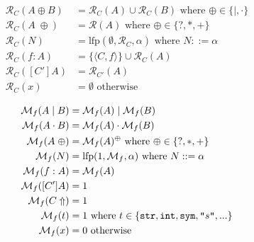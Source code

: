 \documentclass[a4paper]{article}
\begin{document}
\def\fixpoint{\ensuremath{\text{lfp}}}
\def\reachability{\ensuremath{\mathcal{R}}}
\begin{align}
\reachability_C(A \oplus B) &= \reachability_C(A) \cup \reachability_C(B)
 \text{ where } \oplus \in \{\mid, \cdot\}\\
\reachability_C(A\;\oplus) &= \reachability(A) \text{ where } \oplus \in \{?, *, +\}\\
\reachability_C(N) &= \fixpoint(\emptyset, \reachability_C, \alpha) \text{ where }N ::= \alpha\\
\reachability_C(f: A) &= \{\langle C, f\rangle\} \cup \reachability_C(A)\\
\reachability_C([C'] A) &= \reachability_{C'}(A)\\
\reachability_C(x) &= \emptyset \text{ otherwise }
\end{align}

\def\mymultjoin{\ensuremath{\myjoin}}
\def\mymultmeet{\ensuremath{\mymeet}}
\def\mymultbottom{\ensuremath{1}}
\def\multof{\ensuremath{\mathcal{M}}}
\def\multoff{\ensuremath{\multof_f}}

\begin{align}
\multoff(A\mid B) &= \multoff(A) \mymultjoin  \multoff(B)\\
\multoff(A\cdot B) &= \multoff(A) \mymultmeet  \multoff(B)\\
\multoff(A\;\oplus) &= \multoff(A)^\oplus \text{ where } \oplus\in \{?, *, +\}\\
\multoff(N) &= \fixpoint(\mymultbottom, \multoff, \alpha) \text{ where } N ::= \alpha\\
\multoff(f: A) &= \multoff(A)\\
\multoff([C'] A) &= 1\\
\multoff(C\Uparrow) &= 1\\
\multoff(t) &= 1 \text{ where } t\in \{\text{\texttt{str}}, \text{\texttt{int}}, \text{\texttt{sym}}, \literal{s}, ...  \}\\
\multoff(x) &= 0 \text{ otherwise}
\end{align}
\end{document}
